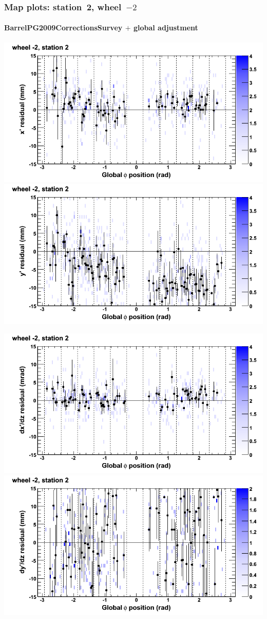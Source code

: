 \documentclass[compress]{beamer}
\begin{document}
\begin{frame}
\frametitle{Map plots: station~2, wheel~$-2$}
\framesubtitle{BarrelPG2009CorrectionsSurvey $+$ global adjustment}
\includegraphics[width=0.5\linewidth]{mapplots_re01/DTvsphi_st2whA_x.png}
\includegraphics[width=0.5\linewidth]{mapplots_re01/DTvsphi_st2whA_y.png}

\includegraphics[width=0.5\linewidth]{mapplots_re01/DTvsphi_st2whA_dxdz.png}
\includegraphics[width=0.5\linewidth]{mapplots_re01/DTvsphi_st2whA_dydz.png}
\end{frame}
\end{document}
